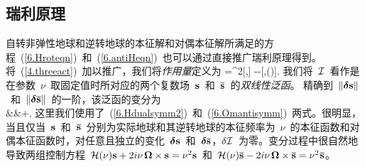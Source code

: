 \renewcommand{\thesubsection}{$\!\!\!\raise1.3ex\hbox{$\star$}\!\!$
\arabic{chapter}.\arabic{section}.\arabic{subsection}}
\subsection{瑞利原理}
%
\label{6.sec.Rayrot}
\renewcommand{\thesubsection}{\arabic{chapter}.\arabic{section}.\arabic{subsection}}

自转非弹性地球和逆转地球的本征解和对偶本征解所满足的方程~(\ref{6.Hroteqn})~和~(\ref{6.antiHeqn})~也可以通过直接推广瑞利原理得到。将~(\ref{4.threeact})~加以推广，我们将{\em 作用量\/}定义为
%
\eq
\label{6.rotACTION}
\sI=\half\nu^2[\hspace{0.3 mm}\overline{\bs},\bs]
-
-\textcolor{red}{\half}[\hspace{0.3 mm}\overline{\bs},\sH(\nu)\bs].
\en
我们将~$\mbox{$\cal I$}$~看作是在参数~$\nu$~取固定值时所对应的两个复数场~$\mbox{${\bf s}$}$~和~$\overline{\mbox{${\bf s}$}}$~的{\em 双线性泛函\/}。
%
%
精确到~$\|\mbox{\boldmath $\bf \delta$}\mbox{${\bf s}$}\|$~和~$\|\mbox{\boldmath $\bf \delta$}\overline{\mbox{${\bf s}$}}\|$~的一阶，该泛函的变分为
\eqa
{} \nonumber \\
&&\mbox{}\qquad\qquad+,
\ena
这里我们使用了~(\ref{6.Hdualsymm2})~和~(\ref{6.Omantisymm})~两式。很明显，当且仅当~$\mbox{${\bf s}$}$~和~$\overline{\mbox{${\bf s}$}}$~分别为实际地球和其逆转地球的本征频率为~$\nu$~的本征函数和对偶本征函数时，对任意且独立的变化~$\mbox{\boldmath $\bf \delta$}\mbox{${\bf s}$}$~和~$\mbox{\boldmath $\bf \delta$}\overline{\mbox{${\bf s}$}}$，$\delta\mbox{$\cal I$}$~为零。变分过程中很自然地导致两组控制方程~$\mbox{$\cal H$}(\nu)\mbox{${\bf s}$}+2i\nu_{\,}
\mbox{\boldmath $\bf \Omega$}\times\mbox{${\bf s}$}=\nu^2\mbox{${\bf s}$}$~和~$\mbox{$\cal H$}(\nu)\overline{\mbox{${\bf s}$}}-2i\nu_{\,}
\mbox{\boldmath $\bf \Omega$}\times\overline{\mbox{${\bf s}$}}=\nu^2\hspace{0.2 mm}\overline{\mbox{${\bf s}$}}$。

